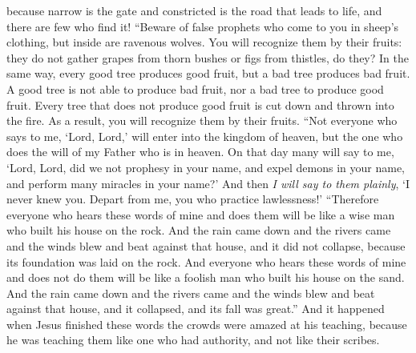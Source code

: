 \begin{biblechapter}
\verse because narrow is the gate and constricted is the road that leads to life, and there are few who find it!
 “Beware of false prophets who come to you in sheep’s clothing, but inside are ravenous wolves.
\verse You will recognize them by their fruits: they do not gather grapes from thorn bushes or figs from thistles, do they?
\verse In the same way, every good tree produces good fruit, but a bad tree produces bad fruit.
\verse A good tree is not able to produce bad fruit, nor a bad tree to produce good fruit.
\verse Every tree that does not produce good fruit is cut down and thrown into the fire.
\verse As a result, you will recognize them by their fruits.
 “Not everyone who says to me, ‘Lord, Lord,’ will enter into the kingdom of heaven, but the one who does the will of my Father who is in heaven.
\verse On that day many will say to me, ‘Lord, Lord, did we not prophesy in your name, and expel demons in your name, and perform many miracles in your name?’
\verse And then \textit{I will say to them plainly}, ‘I never knew you. Depart from me, you who practice lawlessness!’
 “Therefore everyone who hears these words of mine and does them will be like a wise man who built his house on the rock.
\verse And the rain came down and the rivers came and the winds blew and beat against that house, and it did not collapse, because its foundation was laid on the rock.
\verse And everyone who hears these words of mine and does not do them will be like a foolish man who built his house on the sand.
\verse And the rain came down and the rivers came and the winds blew and beat against that house, and it collapsed, and its fall was great.”
 And it happened when Jesus finished these words the crowds were amazed at his teaching,
\verse because he was teaching them like one who had authority, and not like their scribes.
\end{biblechapter}

